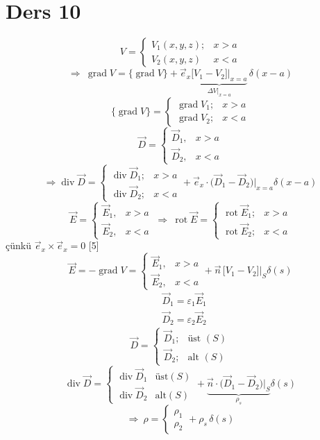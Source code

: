 \documentclass[11pt,a4paper]{article}
\begin{document}
\section{Ders 10}
\[ V=\begin{cases}V_1(x,y,z); & x>a\\ V_2(x,y,z) & x<a\end{cases} \]
\[ \Rightarrow\ \operatorname{grad}V=\{\operatorname{grad}V\}+\vec e_x\underbrace{\bigl[V_1-V_2\bigr]\Big|_{x=a}}_{\Delta V|_{x=a}}\,\delta(x-a) \]
\[ \{\operatorname{grad}V\}=\begin{cases}\operatorname{grad}V_1; & x>a\\ \operatorname{grad}V_2; & x<a\end{cases} \]
\[ \vec D=\begin{cases}\vec D_1, & x>a\\ \vec D_2, & x<a\end{cases} \]
\[ \Rightarrow\operatorname{div}\vec D=\begin{cases}\operatorname{div}\vec D_1; & x>a\\ \operatorname{div}\vec D_2; & x<a\end{cases}+\vec e_x\cdot\bigl(\vec D_1-\vec D_2\bigr)\Big|_{x=a}\delta(x-a) \]
\[ \vec E=\begin{cases}\vec E_1, & x>a\\ \vec E_2, & x<a\end{cases}\ \Rightarrow\ \operatorname{rot}\vec E=\begin{cases}\operatorname{rot}\vec E_1; & x>a\\ \operatorname{rot}\vec E_2; & x<a\end{cases} \]
çünkü $\vec e_x\times\vec e_x=0$
[5]
\[ \vec E=-\operatorname{grad}V=\begin{cases}\vec E_1, & x>a\\ \vec E_2, & x<a\end{cases}+\vec n\,\bigl[V_1-V_2\bigr]\Big|_S\delta(s) \]
\begin{align*}
&\vec D_1=\varepsilon_1\vec E_1\\
&\vec D_2=\varepsilon_2\vec E_2
\end{align*}
\[ \vec D=\begin{cases}\vec D_1; & \text{üst }(S)\\ \vec D_2; & \text{alt }(S)\end{cases} \]
\[ \operatorname{div}\vec D=\begin{cases}\operatorname{div}\vec D_1 & \text{üst}(S)\\ \operatorname{div}\vec D_2 & \text{alt}(S)\end{cases}+\underbrace{\vec n\cdot\bigl(\vec D_1-\vec D_2\bigr)\Big|_S}_{\rho_s}\delta(s) \]
\[ \Rightarrow\ \rho=\begin{cases}\rho_1\\ \rho_2\end{cases}+\rho_s\,\delta(s) \]
\end{document}

